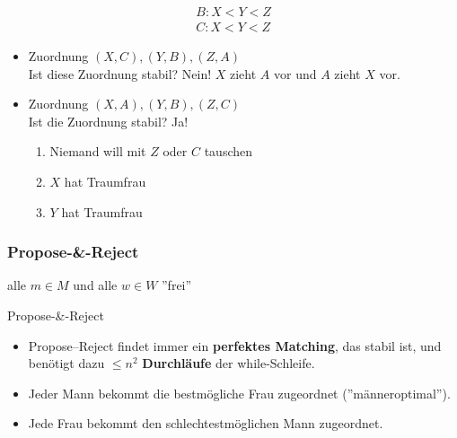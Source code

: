 \documentclass{scrartcl}
\begin{document}
\begin{itemize}
\begin{minipage}{.5\linewidth}
\begin{align*}
		B: X < Y < Z \\
		C: X < Y < Z
		\end{align*}
	\end{minipage}
	\begin{itemize}
		\item Zuordnung $ (X,C),(Y,B),(Z,A) $ \\
		Ist diese Zuordnung stabil? Nein! $ X $ zieht $ A $ vor und $ A $ zieht $ X $ vor.
		\item Zuordnung $ (X,A),(Y,B),(Z,C) $ \\
		Ist die Zuordnung stabil? Ja!
		\begin{enumerate}
			\item Niemand will mit $ Z $ oder $ C $ tauschen
			\item $ X $ hat Traumfrau
			\item $ Y $ hat Traumfrau
		\end{enumerate}
	\end{itemize}
\end{itemize}

\subsubsection{Propose-\&-Reject}

\begin{algorithm}[H]
	alle $ m \in M $ und alle $ w \in W $ ''frei'' \\
	\caption{Propose-\&-Reject}
\end{algorithm}

\begin{itemize}
	\item Propose--Reject findet immer ein \textbf{perfektes Matching}, das stabil ist, und benötigt dazu $ \leq n^2 $ \textbf{Durchläufe} der while-Schleife.
	\item Jeder Mann bekommt die bestmögliche Frau zugeordnet (''männeroptimal'').
	\item Jede Frau bekommt den schlechtestmöglichen Mann zugeordnet.
\end{itemize}
\end{document}
